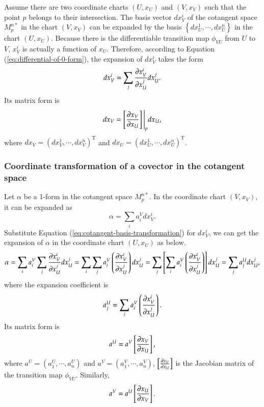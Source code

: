 \documentclass[11pt, a4paper]{book}
\begin{document}
Assume there are two coordinate charts $(U,x_U)$ and $(V,x_V)$ such that the point $p$
belongs to their intersection. The basis vector $dx_V^{i}$ of the cotangent space
$M_p^{n*}$ in the chart $(V,x_V)$ can be expanded by the basis
$\left\{ dx_U^1,\cdots,dx_U^n \right\}$ in the chart $(U,x_U)$. Because there is the
differentiable transition map $\phi_{VU}$ from $U$ to $V$, $x_V^i$ is actually a function
of $x_U$. Therefore, according to Equation (\ref{eq:differential-of-0-form}), the
expansion of $dx_V^i$ takes the form
\begin{equation}
  \label{eq:cotangent-basis-transformation}
  dx_V^i=\sum_j \frac{\partial x_V^i}{\partial x_U^j} dx_U^j.
\end{equation}
Its matrix form is
\begin{equation}
  dx_V = \left[ \frac{\partial x_V}{\partial x_U} \right]\Bigg\vert_p dx_U,
\end{equation}
where $dx_V = (dx_V^1,\cdots,dx_V^n)^{\mathrm{T}}$ and $dx_U = (dx_U^1,\cdots,dx_U^n)^{\mathrm{T}}$.


\subsubsection{Coordinate transformation of a covector in the cotangent space}
\label{sec:covector-transformation}

Let $\alpha$ be a 1-form in the cotangent space $M_p^{n*}$. In the coordinate chart
$(V,x_V)$, it can be expanded as
\begin{equation*}
  \alpha = \sum_i a_i^V dx_V^i.
\end{equation*}
Substitute Equation (\ref{eq:cotangent-basis-transformation}) for $dx_V^i$, we can get the
expansion of $\alpha$ in the coordinate chart $(U,x_U)$ as below.
\begin{equation*}
  \alpha = \sum_i a_i^V \sum_j \frac{\partial x_V^i}{\partial x_U^j} dx_U^j = \sum_i\sum_j
  a_i^V \left( \frac{\partial x_V^i}{\partial x_U^j} \right) dx_U^j = \sum_j \left[ \sum_i
    a_i^V \left( \frac{\partial x_V^i}{\partial x_U^j} \right) \right] dx_U^j = \sum_j a_j^U dx_U^j,
\end{equation*}
where the expansion coefficient is
\begin{equation*}
  \label{eq:covector-transformation}
  a_j^U = \sum_i a_i^V \left( \frac{\partial x_V^i}{\partial x_U^j} \right).
\end{equation*}
Its matrix form is
\begin{equation}
  a^U = a^V \left[ \frac{\partial x_V}{\partial x_U} \right],
\end{equation}
where $a^U = (a_1^U,\cdots,a_n^U)$ and $a^V = (a_1^V,\cdots,a_n^V)$,
$\left[ \frac{\partial x_V}{\partial x_U} \right]$ is the Jacobian matrix of the transition map
$\phi_{VU}$. Similarly,
\begin{equation}
a^V = a^U \left[ \frac{\partial x_U}{\partial x_V} \right].
\end{equation}
\end{document}
